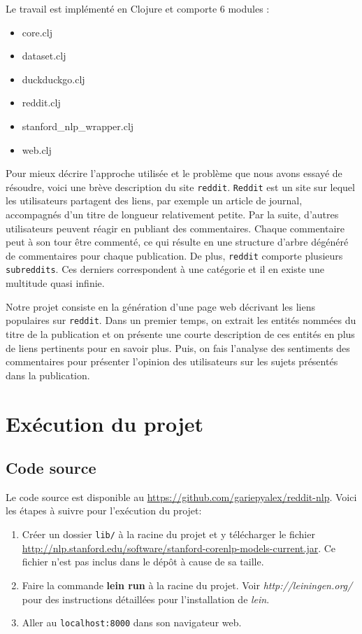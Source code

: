 \documentclass[12pt]{article}
\begin{document}
Le travail est implémenté en Clojure et comporte 6 modules :
\begin{itemize}
\item core.clj
\item dataset.clj
\item duckduckgo.clj
\item reddit.clj
\item stanford\_nlp\_wrapper.clj
\item web.clj
\end{itemize}

Pour mieux décrire l'approche utilisée et le problème que nous avons essayé de résoudre, voici une brève description du site \verb;reddit;.
\verb;Reddit; est un site sur lequel les utilisateurs partagent
des liens, par exemple un article de journal, accompagnés d'un titre de longueur relativement petite.
Par la suite, d'autres utilisateurs peuvent réagir en publiant des commentaires. Chaque commentaire peut à son tour être commenté,
ce qui résulte en une structure d'arbre dégénéré de commentaires pour chaque publication.
De plus, \verb;reddit; comporte plusieurs \verb;subreddits;. Ces derniers correspondent à une catégorie et il en existe une multitude quasi infinie.


Notre projet consiste en la génération d'une page web décrivant les liens populaires sur \verb;reddit;. Dans un premier temps, on extrait les entités nommées
du titre de la publication et on présente une courte description de ces entités en plus de liens pertinents pour en savoir plus.
Puis, on fais l'analyse des sentiments des commentaires pour présenter l'opinion des utilisateurs sur les sujets présentés dans la publication.

\section{Exécution du projet}
\subsection{Code source}
Le code source est disponible au \url{https://github.com/gariepyalex/reddit-nlp}. Voici les étapes à suivre pour l'exécution du projet:
\begin{enumerate}
\item Créer un dossier \verb;lib/; à la racine du projet et y télécharger le fichier \url{http://nlp.stanford.edu/software/stanford-corenlp-models-current.jar}. Ce fichier n'est pas inclus dans le dépôt à cause de sa taille.
\item Faire la commande \textbf{lein run} à la racine du projet. Voir \emph{http://leiningen.org/} pour des instructions détaillées pour l'installation de \emph{lein}.
\item Aller au \verb;localhost:8000; dans son navigateur web.
\end{enumerate}
\end{document}
